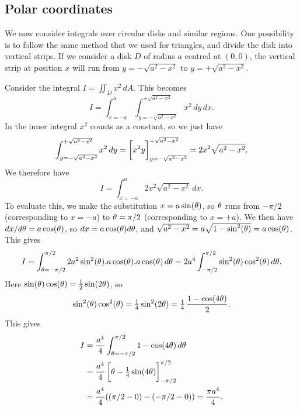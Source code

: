 \documentclass[reqno]{amsart}
\theoremstyle{definition}
\begin{document}
\subsection{Polar coordinates}
\label{subsec-polar}

We now consider integrals over circular disks and similar regions.
One possibility is to follow the same method that we used for
triangles, and divide the disk into vertical strips.  If we consider a
disk $D$ of radius $a$ centred at $(0,0)$, the vertical strip at
position $x$ will run from $y=-\sqrt{a^2-x^2}$ to $y=+\sqrt{a^2-x^2}$.
\begin{center}
\end{center}

Consider the integral $I=\iint_D x^2\,dA$.  This becomes
\[ I=
    \int_{x=-a}^a \int_{y=-\sqrt{a^2-x^2}}^{+\sqrt{a^2-x^2}} x^2\,dy\,dx.
\]
In the inner integral $x^2$ counts as a constant, so we just have
\[ \int_{y=-\sqrt{a^2-x^2}}^{+\sqrt{a^2-x^2}} x^2\,dy = 
    \CH{x^2y}_{y=-\sqrt{a^2-x^2}}^{+\sqrt{a^2-x^2}} = 
     2x^2\sqrt{a^2-x^2}.
\]
We therefore have
\[ I = \int_{x=-a}^a 2x^2\sqrt{a^2-x^2}\,dx. \]
To evaluate this, we make the substitution $x=a\sin(\theta)$, so $\theta$
runs from $-\pi/2$ (corresponding to $x=-a$) to $\theta=\pi/2$
(corresponding to $x=+a$).  We then have $dx/d\theta=a\cos(\theta)$, so
$dx=a\cos(\theta)d\theta$, and
$\sqrt{a^2-x^2}=a\sqrt{1-\sin^2(\theta)}=a\cos(\theta)$.  This gives
\[ I = \int_{\theta=-\pi/2}^{\pi/2}
      2a^2\sin^2(\theta).a\cos(\theta).a\cos(\theta)\,d\theta = 
       2a^4\int_{-\pi/2}^{\pi/2} \sin^2(\theta)\cos^2(\theta)\,d\theta.
\]
Here $\sin(\theta)\cos(\theta)=\tfrac{1}{2}\sin(2\theta)$, so 
\[ \sin^2(\theta)\cos^2(\theta) = \tfrac{1}{4}\sin^2(2\theta) = 
    \tfrac{1}{4}\,\frac{1-\cos(4\theta)}{2}.
\]
This gives
\begin{align*}
 I &= \frac{a^4}{4} \int_{\tht=-\pi/2}^{\pi/2} 1-\cos(4\tht)\,d\tht \\
   &= \frac{a^4}{4}
       \CH{\tht - \tfrac{1}{4}\sin(4\tht)}_{-\pi/2}^{\pi/2} \\
   &= \frac{a^4}{4} ((\pi/2-0)-(-\pi/2-0)) = \frac{\pi a^4}{4}.
\end{align*}
\end{document}
